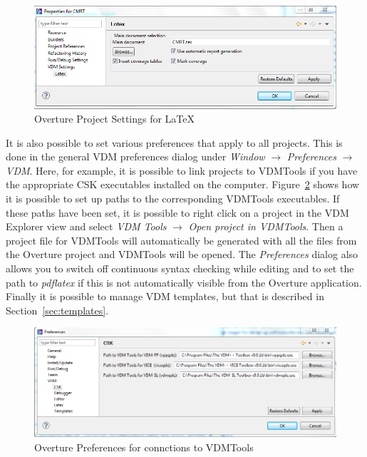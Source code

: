 \documentclass{overturerepchap}
\begin{document}
\begin{figure}[!hbt]
\begin{center}
  \includegraphics[width=\textwidth]{screenDumps/projectsettingslatex}
  \caption[Overture Project Settings]{Overture Project Settings for \LaTeX}
  \label{fig:VDMSettingsLatex}
\end{center}
\end{figure}

It is also possible to set various preferences that apply to
all projects. This is done in the general VDM preferences dialog under
\emph{Window} $\rightarrow$ \emph{Preferences} $\rightarrow$
\emph{VDM}. Here, for example, it is possible to link projects to
VDMTools if you have the appropriate CSK executables installed on
the computer. Figure~\ref{fig:CSKPreferences} shows how it is possible to
set up paths to the corresponding VDMTools executables. If these paths have
been set, it is possible to right click on a project in the VDM
Explorer view and select \emph{VDM Tools} $\rightarrow$
\emph{Open project in VDMTools}. Then a project file for VDMTools
will automatically be generated with all the files from the Overture project
and VDMTools will be opened. The \emph{Preferences} dialog also
allows you to switch off continuous syntax checking while editing and
to set the path to \emph{pdflatex} if this is not automatically
visible from the Overture application. Finally it is possible to 
manage VDM templates, but that is described in Section~\ref{sec:templates}. 

\begin{figure}[!hbt]
\begin{center}
  \includegraphics[width=\textwidth]{screenDumps/CSKPreferences}
  \caption{Overture Preferences for connctions to VDMTools}
  \label{fig:CSKPreferences}
\end{center}
\end{figure}
\end{document}
